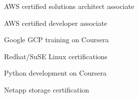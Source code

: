 

\begin{cvparagraph}

\hfill

\begin{cvitems} %
    \item {AWS certified solutions architect associate}
    \item {AWS certified developer associate}
    \item {Google GCP training on Coursera}
    \item {Redhat/SuSE Linux certifications}
    \item {Python development on Coursera}
    \item {Netapp storage certification}
\end{cvitems}

\end{cvparagraph}
